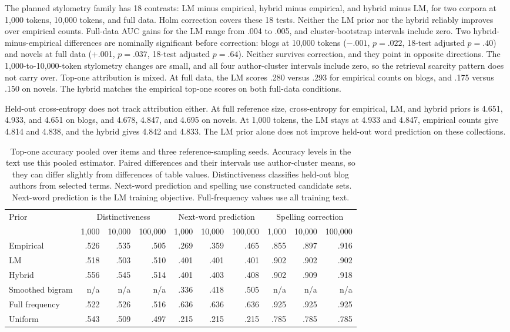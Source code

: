 \documentclass[11pt]{article}
\begin{document}
The planned stylometry family has 18 contrasts: LM minus empirical, hybrid
minus empirical, and hybrid minus LM, for two corpora at 1,000 tokens, 10,000
tokens, and full data. Holm correction covers these 18 tests. Neither the LM
prior nor the hybrid reliably improves over empirical counts. Full-data AUC gains for the LM
range from .004 to .005, and cluster-bootstrap intervals include zero. Two
hybrid-minus-empirical differences are nominally significant before
correction: blogs at 10,000 tokens ($-.001$, $p=.022$, 18-test adjusted
$p=.40$) and novels at full data (+.001, $p=.037$, 18-test adjusted $p=.64$). Neither survives
correction, and they point in opposite directions. The 1,000-to-10,000-token stylometry changes are small, and all
four author-cluster intervals include zero, so the retrieval scarcity pattern
does not carry over. Top-one attribution is mixed. At full data, the LM scores
.280 versus .293 for empirical counts on blogs, and .175 versus .150 on novels.
The hybrid matches the empirical top-one scores on both full-data conditions.

Held-out cross-entropy does not track attribution either. At full reference
size, cross-entropy for empirical, LM, and hybrid priors is 4.651, 4.933, and
4.651 on blogs, and 4.678, 4.847, and 4.695 on novels. At 1,000 tokens, the LM
stays at 4.933 and 4.847, empirical counts give 4.814 and 4.838, and the hybrid
gives 4.842 and 4.833. The LM prior alone does not improve held-out word
prediction on these collections.

\begin{table}[t]
\centering
\small
\begin{tabular}{lrrrrrrrrr}
\toprule
Prior & \multicolumn{3}{c}{Distinctiveness} &
\multicolumn{3}{c}{Next-word prediction} &
\multicolumn{3}{c}{Spelling correction} \\
 & 1,000 & 10,000 & 100,000 & 1,000 & 10,000 & 100,000 &
  1,000 & 10,000 & 100,000 \\
\midrule
Empirical & .526 & .535 & .505 & .269 & .359 & .465 & .855 & .897 & .916 \\
LM & .518 & .503 & .510 & .401 & .401 & .401 & .902 & .902 & .902 \\
Hybrid & .556 & .545 & .514 & .401 & .403 & .408 & .902 & .909 & .918 \\
Smoothed bigram & n/a & n/a & n/a & .336 & .418 & .505 & n/a & n/a & n/a \\
Full frequency & .522 & .526 & .516 & .636 & .636 & .636 & .925 & .925 & .925 \\
Uniform & .543 & .509 & .497 & .215 & .215 & .215 & .785 & .785 & .785 \\
\bottomrule
\end{tabular}
\caption{Top-one accuracy pooled over items and three reference-sampling
seeds. Accuracy levels in the text use this pooled estimator. Paired
differences and their intervals use author-cluster means, so they can differ
slightly from differences of table values.
Distinctiveness classifies held-out blog authors from selected terms.
Next-word prediction and spelling use constructed candidate sets. Next-word
prediction is the LM training objective. Full-frequency values use all
training text.}
\label{tab:extensions}
\end{table}
\end{document}
